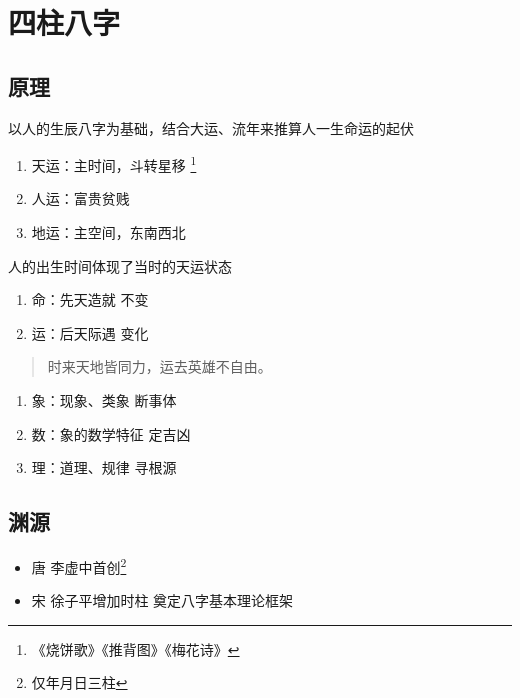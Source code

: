 \chapter{四柱八字}


\section{原理}
以人的生辰八字为基础，结合大运、流年来推算人一生命运的起伏
\begin{enumerate}
  \item 天运：主时间，斗转星移
    \footnote{《烧饼歌》《推背图》《梅花诗》}
  \item 人运：富贵贫贱
  \item 地运：主空间，东南西北
\end{enumerate}
人的出生时间体现了当时的天运状态
\begin{enumerate}
  \item 命：先天造就 不变
  \item 运：后天际遇 变化
\end{enumerate}

\begin{quote}
  时来天地皆同力，运去英雄不自由。
\end{quote}
\begin{enumerate}
  \item 象：现象、类象 断事体
  \item 数：象的数学特征 定吉凶
  \item 理：道理、规律 寻根源
\end{enumerate}


\section{渊源}
\begin{itemize}
  \item 唐 李虚中首创\footnote{仅年月日三柱}
  \item 宋 徐子平增加时柱 奠定八字基本理论框架
\end{itemize}
